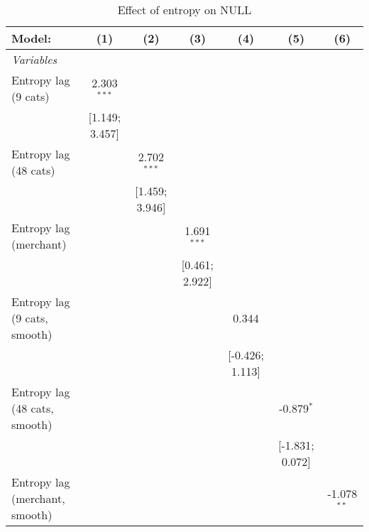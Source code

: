 
\begin{table}[htbp]
   \centering
   \tiny
   \begin{threeparttable}[b]
      \caption{\label{tab:reg_investments_main} Effect of entropy on NULL}
      \begin{tabular}{lcccccc}
         \tabularnewline \midrule \midrule
         Model:                         & (1)              & (2)              & (3)              & (4)              & (5)              & (6)\\  
         \midrule
         \emph{Variables}\\
         Entropy lag (9 cats)           & 2.303$^{***}$    &                  &                  &                  &                  &   \\   
                                        & [1.149; 3.457]   &                  &                  &                  &                  &   \\   
         Entropy lag (48 cats)          &                  & 2.702$^{***}$    &                  &                  &                  &   \\   
                                        &                  & [1.459; 3.946]   &                  &                  &                  &   \\   
         Entropy lag (merchant)         &                  &                  & 1.691$^{***}$    &                  &                  &   \\   
                                        &                  &                  & [0.461; 2.922]   &                  &                  &   \\   
         Entropy lag (9 cats, smooth)   &                  &                  &                  & 0.344            &                  &   \\   
                                        &                  &                  &                  & [-0.426; 1.113]  &                  &   \\   
         Entropy lag (48 cats, smooth)  &                  &                  &                  &                  & -0.879$^{*}$     &   \\   
                                        &                  &                  &                  &                  & [-1.831; 0.072]  &   \\   
         Entropy lag (merchant, smooth) &                  &                  &                  &                  &                  & -1.078$^{**}$\\   

\end{tabular}
\end{threeparttable}
\end{table}
